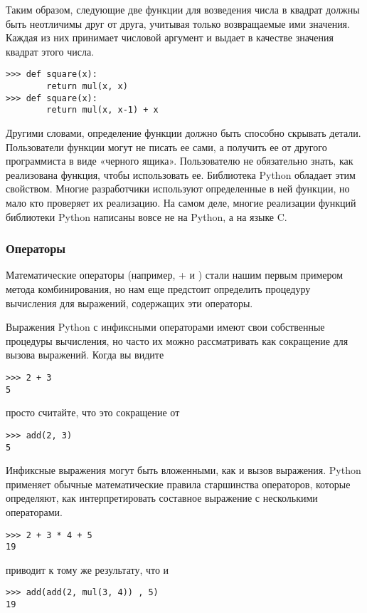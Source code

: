 Таким образом, следующие две функции для возведения числа в квадрат должны быть неотличимы друг от друга, учитывая только возвращаемые ими значения.
Каждая из них принимает числовой аргумент и выдает в качестве значения квадрат этого числа.
\begin{verbatim}
>>> def square(x):
        return mul(x, x)
>>> def square(x):
        return mul(x, x-1) + x
\end{verbatim}

Другими словами, определение функции должно быть способно скрывать детали.
Пользователи функции могут не писать ее сами, а получить ее от другого программиста в виде «черного ящика».
Пользователю не обязательно знать, как реализована функция, чтобы использовать ее.
Библиотека Python обладает этим свойством. Многие разработчики используют определенные в ней функции, но мало кто проверяет их реализацию.
На самом деле, многие реализации функций библиотеки Python написаны вовсе не на Python, а на языке C.

\subsubsection{Операторы}
Математические операторы (например, + и \-) стали нашим первым примером метода комбинирования, но нам еще предстоит определить процедуру вычисления для выражений, содержащих эти операторы.

Выражения Python с инфиксными операторами имеют свои собственные процедуры вычисления, но часто их можно рассматривать как сокращение для вызова выражений. Когда вы видите
\begin{verbatim}
>>> 2 + 3
5
\end{verbatim}

просто считайте, что это сокращение от
\begin{verbatim}
>>> add(2, 3)
5
\end{verbatim}

Инфиксные выражения могут быть вложенными, как и вызов выражения. Python применяет обычные математические правила старшинства операторов, которые определяют, как интерпретировать составное выражение с несколькими операторами.
\begin{verbatim}
>>> 2 + 3 * 4 + 5
19
\end{verbatim}

приводит к тому же результату, что и
\begin{verbatim}
>>> add(add(2, mul(3, 4)) , 5)
19
\end{verbatim}

